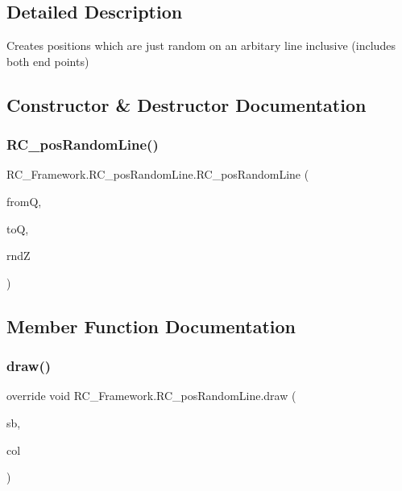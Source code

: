 \subsection{Detailed Description}
Creates positions which are just random on an arbitary line inclusive (includes both end points) 



\subsection{Constructor \& Destructor Documentation}
\mbox{\label{class_r_c___framework_1_1_r_c__pos_random_line_af5be3614b3a992075132dbc476d50abd}} 
\subsubsection{\texorpdfstring{R\+C\+\_\+pos\+Random\+Line()}{RC\_posRandomLine()}}
{\footnotesize\ttfamily R\+C\+\_\+\+Framework.\+R\+C\+\_\+pos\+Random\+Line.\+R\+C\+\_\+pos\+Random\+Line (\begin{DoxyParamCaption}\item[{Vector2}]{fromQ,  }\item[{Vector2}]{toQ,  }\item[{Random}]{rndZ }\end{DoxyParamCaption})}



\subsection{Member Function Documentation}
\mbox{\label{class_r_c___framework_1_1_r_c__pos_random_line_aa0c6137f7d33d80534376f2c4f9612e6}} 
\subsubsection{\texorpdfstring{draw()}{draw()}}
{\footnotesize\ttfamily override void R\+C\+\_\+\+Framework.\+R\+C\+\_\+pos\+Random\+Line.\+draw (\begin{DoxyParamCaption}\item[{Sprite\+Batch}]{sb,  }\item[{Color}]{col }\end{DoxyParamCaption})\hspace{0.3cm}{\ttfamily [virtual]}}



